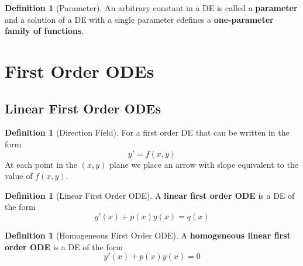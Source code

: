 \documentclass[12pt]{article}
\theoremstyle{definition}
\newtheorem{defn}[thm]{Definition}
\theoremstyle{remark}
\numberwithin{equation}{section}
\newcommand\B[1]{\textbf{ #1}}
\begin{document}
\vspace{1cm}


\begin{defn}[Parameter]
        An arbitrary constant in a DE is called a \B{parameter} and a solution of a DE with a single parameter edefines a \B{one-parameter family of functions}.
\end{defn}




\clearpage 


\section{First Order ODEs}



\subsection{Linear First Order ODEs}

\begin{defn}[Direction Field]
        For a first order DE that can be written in the form \begin{equation}
                y' = f(x,y)
        \end{equation}
        At each point in the $(x,y)$ plane we place an arrow with slope equivalent to the value of $f(x,y)$.
\end{defn}


\vspace{1cm}


\begin{defn}[Linear First Order ODE]
        A \B{linear first order ODE} is a DE of the form \begin{equation}
                y'(x) + p(x)y(x) = q(x) \label{eq:1st}
        \end{equation}
\end{defn}


\vspace{1cm}


\begin{defn}[Homogeneous First Order ODE]
        A \B{homogeneous linear first order ODE} is a DE of the form \begin{equation}
                y'(x) + p(x)y(x) = 0
        \end{equation}
\end{defn}



\vspace{1cm}
\end{document}
